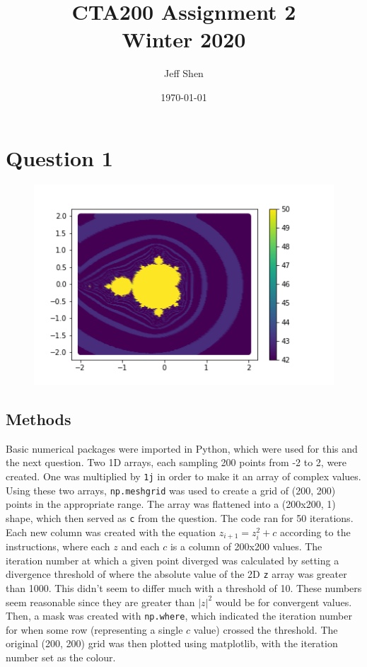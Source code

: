 \documentclass{article}
\newcommand{\code}[1]{\texttt{#1}}
\begin{document}
\title{%
	CTA200 Assignment 2 \\[0.3cm]
	\large Winter 2020}
\author{Jeff Shen}
\date{\today}

\maketitle

\section*{Question 1}

\begin{figure}[!htbp]
	\centering
	\includegraphics[width=0.8\linewidth]{q1.png}
\end{figure}

\subsection*{Methods}

Basic numerical packages were imported in Python, which were used for this and the next question. Two 1D arrays, each sampling 200 points from -2 to 2, were created. One was multiplied by \code{1j} in order to make it an array of complex values. Using these two arrays, \code{np.meshgrid} was used to create a grid of (200, 200) points in the appropriate range. The array was flattened into a (200x200, 1) shape, which then served as \code{c} from the question. The code ran for 50 iterations. Each new column was created with the equation $z_{i+1} = z_i^2 + c$ according to the instructions, where each $z$ and each $c$ is a column of 200x200 values. The iteration number at which a given point diverged was calculated by setting a divergence threshold of where the absolute value of the 2D \code{z} array was greater than 1000. This didn't seem to differ much with a threshold of 10. These numbers seem reasonable since they are greater than $|z|^2$ would be for convergent values. Then, a mask was created with \code{np.where}, which indicated the iteration number for when some row (representing a single $c$ value) crossed the threshold. The original (200, 200) grid was then plotted using matplotlib, with the iteration number set as the colour. 
\end{document}

